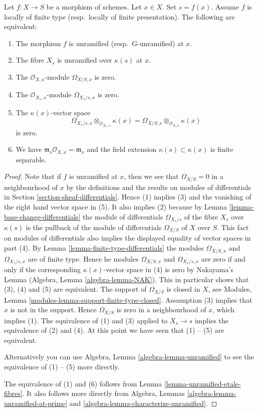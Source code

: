 \begin{lemma}
\label{lemma-unramified-at-point}
Let $f : X \to S$ be a morphism of schemes.
Let $x \in X$.
Set $s = f(x)$.
Assume $f$ is locally of finite type (resp.\ locally of finite presentation).
The following are equivalent:
\begin{enumerate}
\item The morphism $f$ is unramified (resp.\ G-unramified) at $x$.
\item The fibre $X_s$ is unramified over $\kappa(s)$ at $x$.
\item The $\mathcal{O}_{X, x}$-module $\Omega_{X/S, x}$ is zero.
\item The $\mathcal{O}_{X_s, x}$-module $\Omega_{X_s/s, x}$ is zero.
\item The $\kappa(x)$-vector space
$$
\Omega_{X_s/s, x} \otimes_{\mathcal{O}_{X_s, x}} \kappa(x) =
\Omega_{X/S, x} \otimes_{\mathcal{O}_{X, x}} \kappa(x)
$$
is zero.
\item We have $\mathfrak m_s\mathcal{O}_{X, x} = \mathfrak m_x$
and the field extension $\kappa(s) \subset \kappa(x)$ is finite
separable.
\end{enumerate}
\end{lemma}

\begin{proof}
Note that if $f$ is unramified at $x$, then
we see that $\Omega_{X/S} = 0$ in a neighbourhood of $x$
by the definitions and the results on modules of differentials
in Section \ref{section-sheaf-differentials}. Hence (1) implies
(3) and the vanishing of the right hand vector space in (5).
It also implies (2) because by
Lemma \ref{lemma-base-change-differentials}
the module of differentials $\Omega_{X_s/s}$ of the fibre $X_s$
over $\kappa(s)$ is the pullback of the module of differentials
$\Omega_{X/S}$ of $X$ over $S$. This fact on modules of differentials
also implies the displayed equality of vector spaces in part (4). By
Lemma \ref{lemma-finite-type-differentials}
the modules $\Omega_{X/S, x}$ and $\Omega_{X_s/s, x}$ are of finite type.
Hence he modules $\Omega_{X/S, x}$ and $\Omega_{X_s/s, x}$ are zero if and only
if the corresponding $\kappa(x)$-vector space in (4) is zero by
Nakayama's Lemma
(Algebra, Lemma \ref{algebra-lemma-NAK}).
This in particular shows that (3), (4) and (5) are equivalent.
The support of $\Omega_{X/S}$ is closed in $X$, see
Modules, Lemma \ref{modules-lemma-support-finite-type-closed}.
Assumption (3) implies that $x$ is not in the support.
Hence $\Omega_{X/S}$ is zero in a neighbourhood of $x$, which
implies (1). The equivalence of (1) and (3) applied to $X_s \to s$
implies the equivalence of (2) and (4).
At this point we have seen that (1) -- (5) are equivalent.

\medskip\noindent
Alternatively you can use Algebra, Lemma \ref{algebra-lemma-unramified}
to see the equivalence of (1) -- (5) more directly.

\medskip\noindent
The equivalence of (1) and (6) follows from Lemma
\ref{lemma-unramified-etale-fibres}.
It also follows more directly from
Algebra, Lemmas \ref{algebra-lemma-unramified-at-prime} and
\ref{algebra-lemma-characterize-unramified}.
\end{proof}

